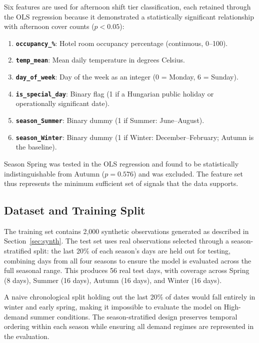 \documentclass[12pt,a4paper,oneside]{article}
\begin{document}
Six features are used for afternoon shift tier classification, each retained through the OLS regression because it demonstrated a statistically significant relationship with afternoon cover counts ($p < 0.05$):

\begin{enumerate}
    \item \textbf{\texttt{occupancy\_\%}}: Hotel room occupancy percentage (continuous, 0--100).
    \item \textbf{\texttt{temp\_mean}}: Mean daily temperature in degrees Celsius.
    \item \textbf{\texttt{day\_of\_week}}: Day of the week as an integer (0 = Monday, 6 = Sunday).
    \item \textbf{\texttt{is\_special\_day}}: Binary flag (1 if a Hungarian public holiday or operationally significant date).
    \item \textbf{\texttt{season\_Summer}}: Binary dummy (1 if Summer: June--August).
    \item \textbf{\texttt{season\_Winter}}: Binary dummy (1 if Winter: December--February; Autumn is the baseline).
\end{enumerate}

Season Spring was tested in the OLS regression and found to be statistically indistinguishable from Autumn ($p = 0.576$) and was excluded. The feature set thus represents the minimum sufficient set of signals that the data supports.

\subsection{Dataset and Training Split}

The training set contains 2,000 synthetic observations generated as described in Section~\ref{sec:synth}. The test set uses real observations selected through a season-stratified split: the last 20\% of each season's days are held out for testing, combining days from all four seasons to ensure the model is evaluated across the full seasonal range. This produces 56 real test days, with coverage across Spring (8 days), Summer (16 days), Autumn (16 days), and Winter (16 days).

A naive chronological split holding out the last 20\% of dates would fall entirely in winter and early spring, making it impossible to evaluate the model on High-demand summer conditions. The season-stratified design preserves temporal ordering within each season while ensuring all demand regimes are represented in the evaluation.
\end{document}
